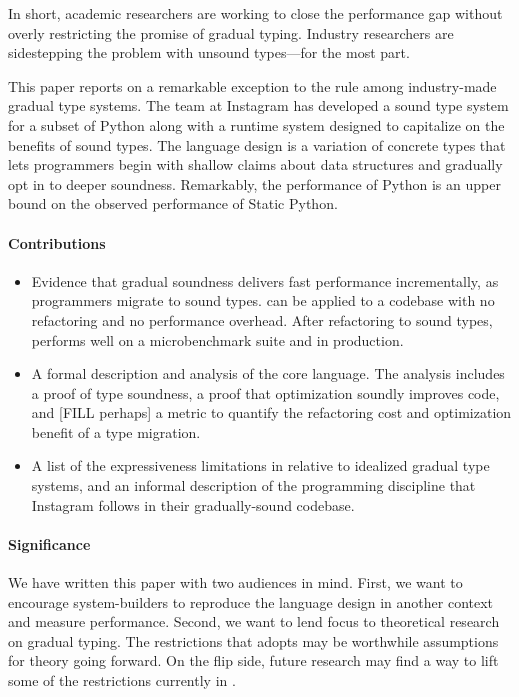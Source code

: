 \documentclass[a4paper,english,cleveref,autoref,thm-restate,anonymous,]{lipics-v2021}
\begin{document}
In short, academic researchers are working to close the performance gap
without overly restricting the promise of gradual typing.
Industry researchers are sidestepping the problem with unsound types---for the most part.

This paper reports on a remarkable exception to the rule among industry-made gradual type systems.
The \SP{} team at Instagram has developed a sound type system for a subset of
Python along with a runtime system designed to
capitalize on the benefits of sound types.
The language design is a variation of concrete types that lets programmers
begin with shallow claims about data structures and gradually opt in to deeper soundness.
Remarkably, the performance of Python is an upper bound on the observed performance of
Static Python.


\paragraph*{Contributions}

\begin{itemize}
  \item
    Evidence that gradual soundness delivers fast performance incrementally,
    as programmers migrate to sound types.
    \SP{} can be applied to a codebase with no refactoring and no performance overhead.
    After refactoring to sound types, \SP{} performs well on a microbenchmark
    suite and in production.
  \item
    A formal description and analysis of the \SP{} core language.
    The analysis includes a proof of type soundness,
    a proof that optimization soundly improves code,
    and [FILL perhaps] a metric to quantify the refactoring cost and optimization benefit
    of a type migration.
  \item
    A list of the expressiveness limitations in \SP{} relative to
    idealized gradual type systems,
    and an informal description of the programming discipline that Instagram
    follows in their gradually-sound codebase.
\end{itemize}


\paragraph*{Significance}

We have written this paper with two audiences in mind.
First, we want to encourage system-builders to reproduce the
\SP{} language design in another context and measure performance.
Second, we want to lend focus to theoretical research on gradual typing.
The restrictions that \SP{} adopts
may be worthwhile assumptions for theory going forward.
On the flip side, future research may find a way to lift some of
the restrictions currently in \SP{}.
\end{document}

